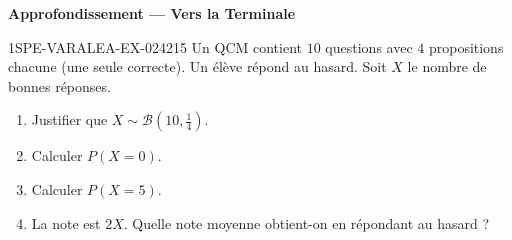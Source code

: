 \begin{center}\textbf{Approfondissement — Vers la Terminale}\end{center}
\begin{exercice}{1SPE-VARALEA-EX-024}{2}{15}
Un QCM contient $10$ questions avec $4$ propositions chacune (une seule correcte). Un élève répond au hasard. Soit $X$ le nombre de bonnes réponses.

\begin{enumerate}
  \item Justifier que $X \sim \mathcal{B}(10, \frac{1}{4})$.
  \item Calculer $P(X = 0)$.
  \item Calculer $P(X = 5)$.
  \item La note est $2X$. Quelle note moyenne obtient-on en répondant au hasard ?
\end{enumerate}
\end{exercice}
